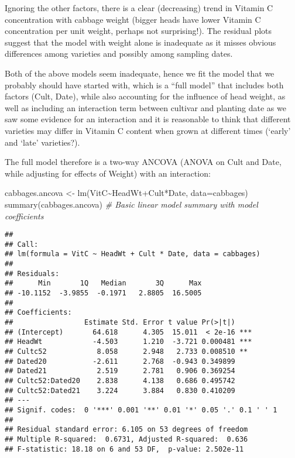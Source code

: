 \documentclass[
]{article}
\newenvironment{Shaded}{\begin{snugshade}}{\end{snugshade}}
\newcommand{\AttributeTok}[1]{\textcolor[rgb]{0.77,0.63,0.00}{#1}}
\newcommand{\CommentTok}[1]{\textcolor[rgb]{0.56,0.35,0.01}{\textit{#1}}}
\newcommand{\FunctionTok}[1]{\textcolor[rgb]{0.00,0.00,0.00}{#1}}
\newcommand{\NormalTok}[1]{#1}
\newcommand{\OtherTok}[1]{\textcolor[rgb]{0.56,0.35,0.01}{#1}}
\newcommand{\SpecialCharTok}[1]{\textcolor[rgb]{0.00,0.00,0.00}{#1}}
\begin{document}
Ignoring the other factors, there is a clear (decreasing) trend in
Vitamin C concentration with cabbage weight (bigger heads have lower
Vitamin C concentration per unit weight, perhaps not surprising!). The
residual plots suggest that the model with weight alone is inadequate as
it misses obvious differences among varieties and possibly among
sampling dates.

Both of the above models seem inadequate, hence we fit the model that we
probably should have started with, which is a ``full model'' that
includes both factors (Cult, Date), while also accounting for the
influence of head weight, as well as including an interaction term
between cultivar and planting date as we saw some evidence for an
interaction and it is reasonable to think that different varieties may
differ in Vitamin C content when grown at different times (`early' and
`late' varieties?).

The full model therefore is a two-way ANCOVA (ANOVA on Cult and Date,
while adjusting for effects of Weight) with an interaction:

\begin{Shaded}
\begin{Highlighting}[]
\NormalTok{cabbages.ancova }\OtherTok{\textless{}{-}} \FunctionTok{lm}\NormalTok{(VitC}\SpecialCharTok{\textasciitilde{}}\NormalTok{HeadWt}\SpecialCharTok{+}\NormalTok{Cult}\SpecialCharTok{*}\NormalTok{Date, }\AttributeTok{data=}\NormalTok{cabbages)}
\FunctionTok{summary}\NormalTok{(cabbages.ancova)  }\CommentTok{\# Basic linear model summary with model coefficients}
\end{Highlighting}
\end{Shaded}

\begin{verbatim}
## 
## Call:
## lm(formula = VitC ~ HeadWt + Cult * Date, data = cabbages)
## 
## Residuals:
##      Min       1Q   Median       3Q      Max 
## -10.1152  -3.9855  -0.1971   2.8805  16.5005 
## 
## Coefficients:
##                 Estimate Std. Error t value Pr(>|t|)    
## (Intercept)       64.618      4.305  15.011  < 2e-16 ***
## HeadWt            -4.503      1.210  -3.721 0.000481 ***
## Cultc52            8.058      2.948   2.733 0.008510 ** 
## Dated20           -2.611      2.768  -0.943 0.349899    
## Dated21            2.519      2.781   0.906 0.369254    
## Cultc52:Dated20    2.838      4.138   0.686 0.495742    
## Cultc52:Dated21    3.224      3.884   0.830 0.410209    
## ---
## Signif. codes:  0 '***' 0.001 '**' 0.01 '*' 0.05 '.' 0.1 ' ' 1
## 
## Residual standard error: 6.105 on 53 degrees of freedom
## Multiple R-squared:  0.6731, Adjusted R-squared:  0.636 
## F-statistic: 18.18 on 6 and 53 DF,  p-value: 2.502e-11
\end{verbatim}
\end{document}
